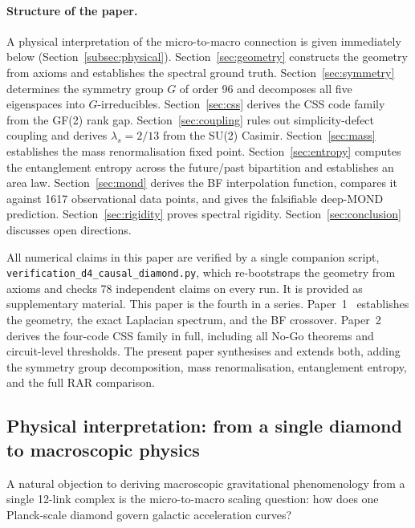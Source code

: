 \documentclass[12pt,a4paper]{article}
\theoremstyle{plain}
\theoremstyle{definition}
\newcommand{\lams}{\lambda_s}
\begin{document}
\paragraph{Structure of the paper.}
A physical interpretation of the micro-to-macro connection is given
immediately below (Section~\ref{subsec:physical}).
Section~\ref{sec:geometry} constructs the geometry from axioms and
establishes the spectral ground truth.
Section~\ref{sec:symmetry} determines the symmetry group $G$ of order 96
and decomposes all five eigenspaces into $G$-irreducibles.
Section~\ref{sec:css} derives the CSS code family from the GF(2) rank
gap.
Section~\ref{sec:coupling} rules out simplicity-defect coupling and
derives $\lams = 2/13$ from the SU(2) Casimir.
Section~\ref{sec:mass} establishes the mass renormalisation fixed point.
Section~\ref{sec:entropy} computes the entanglement entropy across the
future/past bipartition and establishes an area law.
Section~\ref{sec:mond} derives the BF interpolation function, compares
it against 1617 observational data points, and gives the falsifiable
deep-MOND prediction.
Section~\ref{sec:rigidity} proves spectral rigidity.
Section~\ref{sec:conclusion} discusses open directions.

All numerical claims in this paper are verified by a single companion
script, \texttt{verification\_d4\_causal\_diamond.py}, which re-bootstraps
the geometry from axioms and checks 78 independent claims on every run.
It is provided as supplementary material.
This paper is the fourth in a series.
Paper~1~\cite{Schmitt2026a} establishes the geometry, the exact Laplacian
spectrum, and the BF crossover.
Paper~2~\cite{Schmitt2026b} derives the four-code CSS family in full,
including all No-Go theorems and circuit-level thresholds.
The present paper synthesises and extends both, adding the symmetry
group decomposition, mass renormalisation, entanglement entropy,
and the full RAR comparison.

\subsection*{Physical interpretation: from a single diamond to macroscopic physics}
\label{subsec:physical}

A natural objection to deriving macroscopic gravitational phenomenology
from a single 12-link complex is the micro-to-macro scaling question:
how does one Planck-scale diamond govern galactic acceleration curves?
\end{document}
